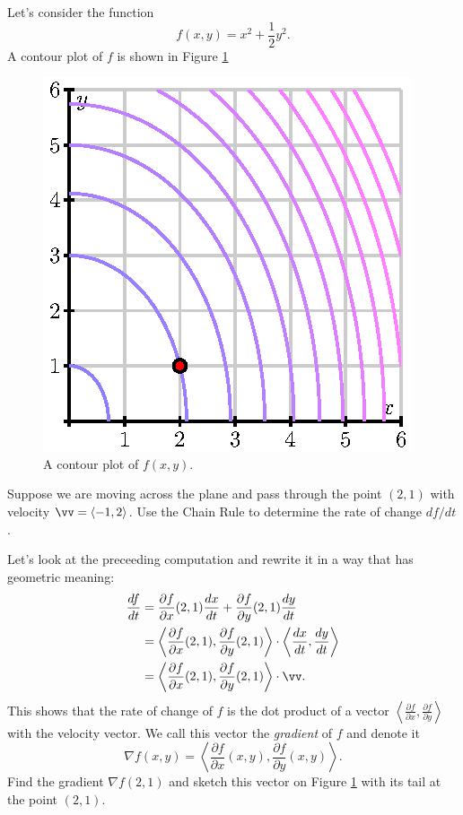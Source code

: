 \begin{pa} \label{PA:10.6} 
  Let's consider the function 
  $$
  f(x,y) = x^2 + \frac 12 y^2.
  $$
  A contour plot of $f$ is shown in Figure \ref{F:10.6.preview.1}

  \begin{figure}[ht]
    \begin{center}
      \includegraphics{figures/fig_10_6_preview_1.eps}
    \end{center}
    \caption{A contour plot of $f(x,y)$.}
    \label{F:10.6.preview.1}
  \end{figure}
  \ba
\item Suppose we are moving across the plane and pass through the
  point $(2,1)$ with velocity $\vv=\langle -1,2\rangle$.  Use the Chain
  Rule to determine the rate of change $df/dt$.
\item Let's look at the preceeding computation and rewrite it in a way
  that has geometric meaning:
  \begin{align*}
    \frac{df}{dt} &= \frac{\partial f}{\partial x}(2,1)\frac{dx}{dt} + 
    \frac{\partial f}{\partial y}(2,1)\frac{dy}{dt} \\
    & = \left\langle \frac{\partial f}{\partial x}(2,1),
    \frac{\partial f}{\partial y}(2,1) \right\rangle \cdot
  \left\langle \frac{dx}{dt}, \frac{dy}{dt}\right\rangle \\
    & = \left\langle \frac{\partial f}{\partial x}(2,1),
    \frac{\partial f}{\partial y}(2,1) \right\rangle \cdot \vv.\\
  \end{align*}
  This shows that the rate of change of $f$ is the dot product of a
  vector $ \left\langle \frac{\partial f}{\partial x}, \frac{\partial
    f}{\partial y} \right\rangle$ with the velocity vector.  We call this
  vector the {\em gradient} of $f$ and denote it
  $$
  \nabla f(x,y) = \left\langle \frac{\partial f}{\partial x}(x,y),
  \frac{\partial f}{\partial y}(x,y) \right\rangle.
  $$
  Find the gradient $\nabla f(2,1)$ and sketch this vector on Figure
  \ref{F:10.6.preview.1} with its tail at the point $(2,1)$.


\end{pa}
